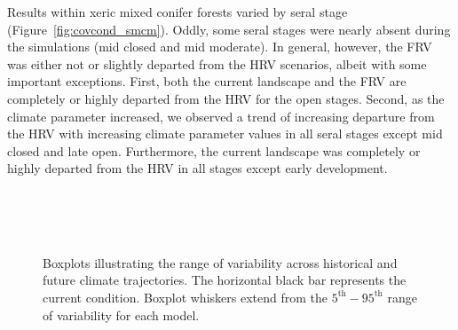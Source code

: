 \documentclass[12pt]{article}
\begin{document}
\begin{spacing}{1}
Results within xeric mixed conifer forests varied by seral stage (Figure~\ref{fig:covcond_smcm}). Oddly, some seral stages were nearly absent during the simulations (mid closed and mid moderate). In general, however, the FRV was either not or slightly departed from the HRV scenarios, albeit with some important exceptions. First, both the current landscape and the FRV are completely or highly departed from the HRV for the open stages. Second, as the climate parameter increased, we observed a trend of increasing departure from the HRV with increasing climate parameter values in all seral stages except mid closed and late open. Furthermore, the current landscape was completely or highly departed from the HRV in all stages except early development. 


\begin{figure}[htbp]
  \centering
   \\
   \\
       \\
    \caption{Boxplots illustrating the range of variability across historical and future climate trajectories. The horizontal black bar represents the current condition. Boxplot whiskers extend from the $5^{\text{th}} - 95^{\text{th}}$ range of variability for each model. }
  \label{fig:covcond_smcx}
\end{figure} %











\end{spacing}
\end{document}
